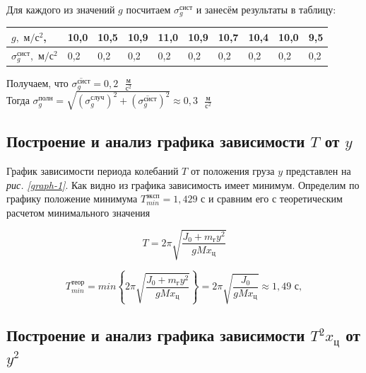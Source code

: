 \documentclass[a4paper,12pt]{article}
\begin{document}
Для каждого из значений $g$ посчитаем $\sigma_{g}^\text{сист}$ и занесём результаты в таблицу:

\begin{table}[!ht]
    \centering
    \begin{tabular}{|l|l|l|l|l|l|l|l|l|l|}
    \hline
        $g,  \text{ м}/\text{с} ^ 2$,  & 10,0 & 10,5 & 10,9 & 11,0 & 10,9 & 10,7 & 10,4 & 10,0 & 9,5 \\ \hline
        $\sigma_{g}^\text{сист},   \text{ м}/\text{с} ^ 2$ & 0,2 & 0,2 & 0,2 & 0,2 & 0,2 & 0,2 & 0,2 & 0,2 & 0,2 \\ \hline
    \end{tabular}
\end{table}

Получаем, что $\overline{\sigma_{g}^\text{сист}} = 0,2 \text{ } \frac{\text{м}}{\text{с}^2}$ \\

Тогда $\sigma_{g}^\text{полн} = \sqrt{\left( \sigma_{g}^\text{случ} \right) ^ 2 + \left( \overline{\sigma_{g}^\text{сист}} \right) ^ 2} \approx 0,3 \text{ } \frac{\text{м}}{\text{с}^2}$

\subsection{Построение и анализ графика зависимости $T$ от $y$}

График зависимости периода колебаний $T$ от положения груза $y$ представлен на \textit{рис. \ref{graph-1}}. Как видно из графика зависимость имеет минимум. Определим по графику положение минимума $T_{min}^{эксп} = 1,429 \text{ с}$ и сравним его с теоретическим расчетом минимального значения

\begin{equation}\label{T-shit}
    T = 2\pi \sqrt{\frac{J_0 + m_\text{г} y^2}{g M x_\text{ц}}}
\end{equation}


\begin{equation}
            T_{min}^{\text{теор}} = min\left\{2\pi \sqrt{\frac{J_0 + m_\text{г} y^2}{g M x_\text{ц}}}\right\} = 2\pi \sqrt{\frac{J_0}{gMx_{\text{ц}}}} \approx 1,49 \text{ с},
\end{equation}

\subsection{Построение и анализ графика зависимости $T^2x_\text{ц}$ от $y^2$}
\end{document}
